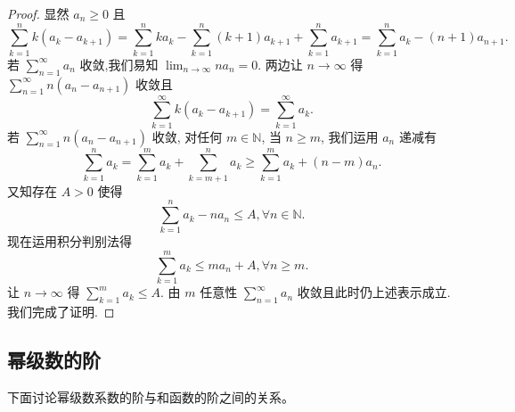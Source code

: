 \documentclass[lang=cn,10pt,thmcnt=section]{elegantbook}
\begin{document}
\begin{proof}
	显然 $a_n \ge 0$ 且
\[
\sum_{k=1}^n k(a_k - a_{k+1}) = \sum_{k=1}^n k a_k - \sum_{k=1}^n (k+1)a_{k+1} + \sum_{k=1}^n a_{k+1} = \sum_{k=1}^n a_k - (n+1)a_{n+1}.
\]
若 $\displaystyle\sum_{n=1}^\infty a_n$ 收敛,我们易知 $\lim_{n\to\infty} na_n = 0$. 两边让 $n \to \infty$ 得 $\displaystyle\sum_{n=1}^\infty n(a_n - a_{n+1})$ 收敛且
\[
\sum_{k=1}^\infty k(a_k - a_{k+1}) = \sum_{k=1}^\infty a_k.
\]
若 $\displaystyle\sum_{n=1}^\infty n(a_n - a_{n+1})$ 收敛, 对任何 $m \in \mathbb{N}$, 当 $n \ge m$, 我们运用 $a_n$ 递减有
\[
\sum_{k=1}^n a_k = \sum_{k=1}^m a_k + \sum_{k=m+1}^n a_k \ge \sum_{k=1}^m a_k + (n-m)a_n.
\]
又知存在 $A>0$ 使得
\[
\sum_{k=1}^n a_k - na_n \le A, \forall n \in \mathbb{N}.
\]
现在运用积分判别法得
\[
\sum_{k=1}^m a_k \le ma_n + A, \forall n \ge m.
\]
让 $n \to \infty$ 得 $\displaystyle\sum_{k=1}^m a_k \le A$. 由 $m$ 任意性 $\displaystyle\sum_{n=1}^\infty a_n$ 收敛且此时仍上述表示成立. 我们完成了证明.

\end{proof}
\subsection{幂级数的阶}
下面讨论幂级数系数的阶与和函数的阶之间的关系。
\end{document}
